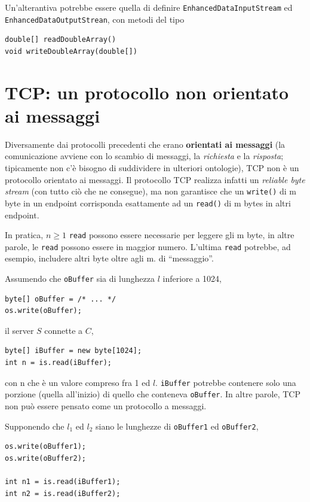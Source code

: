 \documentclass[\fontsizeclass,twocolumn]{\classname}
\theoremstyle{definition}
\theoremstyle{definition}
\begin{document}
Un'alterantiva potrebbe essere quella di definire
\texttt{EnhancedDataInputStream} ed \texttt{EnhancedDataOutputStrean}, con
metodi del tipo 

\begin{lstlisting}
double[] readDoubleArray()
void writeDoubleArray(double[])
\end{lstlisting}

\section{TCP: un protocollo non orientato ai messaggi}

Diversamente dai protocolli precedenti che erano \textbf{orientati ai messaggi}
(la comunicazione avviene con lo scambio di messaggi, la \emph{richiesta} e la
\emph{risposta}; tipicamente non c'è bisogno di suddividere in ulteriori
ontologie), TCP non è un protocollo orientato ai messaggi. Il protocollo TCP
realizza infatti un \emph{reliable byte stream} (con tutto ciò che ne
consegue), ma non garantisce che un \texttt{write()} di m byte in un endpoint
corrisponda esattamente ad un \texttt{read()} di m bytes in altri endpoint.

In pratica, $n \geq 1$ \texttt{read} possono essere necessarie per leggere gli
m byte, in altre parole, le \texttt{read} possono essere in maggior numero.
L'ultima \texttt{read} potrebbe, ad esempio, includere altri byte oltre agli m.
di ``messaggio''.

Assumendo che \texttt{oBuffer} sia di lunghezza $l$ inferiore a 1024,

\begin{lstlisting}
byte[] oBuffer = /* ... */
os.write(oBuffer);
\end{lstlisting}

il server $S$ connette a $C$,

\begin{lstlisting}
byte[] iBuffer = new byte[1024];
int n = is.read(iBuffer);
\end{lstlisting}

con n che è un valore compreso fra 1 ed $l$. \texttt{iBuffer} potrebbe
contenere solo una porzione (quella all'inizio) di quello che conteneva
\texttt{oBuffer}. In altre parole, TCP non può essere pensato come un
protocollo a messaggi.

Supponendo che $l_1$ ed $l_2$ siano le lunghezze di \texttt{oBuffer1} ed \texttt{oBuffer2},



\begin{lstlisting}
os.write(oBuffer1);
os.write(oBuffer2);

int n1 = is.read(iBuffer1);
int n2 = is.read(iBuffer2);
\end{lstlisting}
\end{document}
